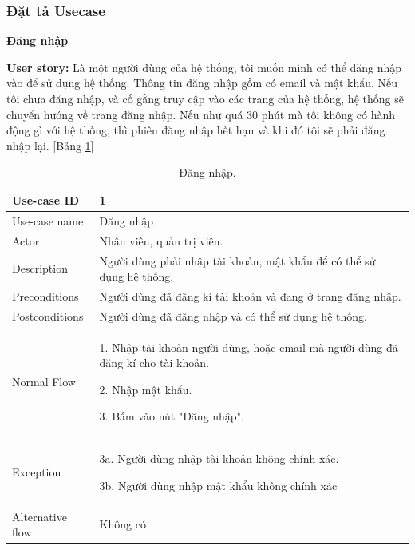 \subsubsection{Đặt tả Usecase}
\textbf{Đăng nhập}\par
\textbf{User story:} Là một người dùng của hệ thống, tôi muốn mình có thể đăng nhập vào để sử dụng hệ thống. Thông tin đăng nhập gồm có email và mật khẩu. Nếu tôi chưa đăng nhập, và cố gắng truy cập vào các trang của hệ thống, hệ thống sẽ chuyển hướng về trang đăng nhập. Nếu như quá 30 phút mà tôi không có hành động gì với hệ thống, thì phiên đăng nhập hết hạn và khi đó tôi sẽ phải đăng nhập lại. [Bảng \ref{bang1}]
\begin{table}[H]
    \centering
    \begin{tabular}{|m{3cm}|m{10cm}|}
    \hline 
        Use-case ID & 1\\ \hline
        Use-case name & Đăng nhập\\ \hline
        Actor & Nhân viên, quản trị viên.\\ \hline
        Description & Người dùng phải nhập tài khoản, mật khẩu để có thể sử dụng hệ thống.\\ \hline
        Preconditions & Người dùng đã đăng kí tài khoản và đang ở trang đăng nhập.\\ \hline
        Postconditions & Người dùng đã đăng nhập và có thể sử dụng hệ thống.\\ \hline
        Normal Flow & 
        1. Nhập tài khoản người dùng, hoặc email mà người dùng đã đăng kí cho tài khoản.\par
        2. Nhập mật khẩu.\par
        3. Bấm vào nút "Đăng nhập".
        \\ \hline
        Exception & 
        3a. Người dùng nhập tài khoản không chính xác.\par
        3b. Người dùng nhập mật khẩu không chính xác
        \\ \hline
        Alternative flow & Không có\\ 
    \hline 
    \end{tabular}
    \caption{Đăng nhập.}
    \label{bang1}
\end{table}


